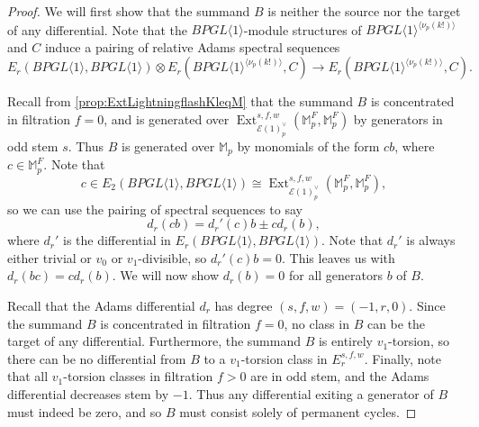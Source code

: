\documentclass{amsart}
\theoremstyle{plain}
\numberwithin{theorem}{section}
\numberwithin{equation}{section}
\numberwithin{figure}{section}
\DeclareMathOperator{\Ext}{Ext}
\newcommand{\mM}{{\mathbb M}}
\newcommand{\cE}{{\mathcal E}}
\newcommand{\0}{\langle 0 \rangle }
\begin{document}
\begin{proof}


We will first show that the summand $B$ is neither the source nor the target of any differential. Note that the $BPGL\langle 1 \rangle$-module structures of $BPGL\langle 1 \rangle^{\langle \nu_p(k!) \rangle}$ and $C$ induce a pairing of relative Adams spectral sequences
\[ E_r\left(BPGL\langle 1 \rangle, BPGL\langle 1 \rangle \right) \otimes E_r\left(BPGL\langle 1 \rangle^{\langle \nu_p(k!) \rangle}, C\right) \to E_r\left(BPGL\langle 1 \rangle^{\langle \nu_p(k!) \rangle}, C\right) .\]

Recall from \cref{prop:ExtLightningflashKleqM} that the summand $B$ is concentrated in filtration $f=0$, and is generated over $\Ext^{s,f,w}_{\cE(1)^\vee_p}(\mM_p^F, \mM_p^F)$ by generators in odd stem $s$. Thus $B$ is generated over $\mathbb{M}_p$ by monomials of the form $cb$, where $c \in \mathbb{M}_p^F$. Note that 
\[
c \in E_2(BPGL\langle 1 \rangle, BPGL\langle 1 \rangle)\cong \Ext^{s,f,w}_{\cE(1)^\vee_p}(\mM_p^F, \mM_p^F),
\]
so we can use the pairing of spectral sequences to say \[d_r\left(cb\right) = d_r'\left(c\right)b \pm cd_r\left(b\right) ,\] 
where $d_r'$ is the differential in $E_r(BPGL\langle 1 \rangle, BPGL \langle 1 \rangle)$. Note that $d_r'$ is always either trivial or $v_0$ or $v_1$-divisible, so $d_r'(c)b = 0$. This leaves us with $d_r(bc) = cd_r(b)$. We will now show $d_r(b) = 0$ for all generators $b$ of $B$. 

Recall that the Adams differential $d_{r}$ has degree $(s,f,w) = (-1,r,0)$. Since the summand $B$ is concentrated in filtration $f=0$, no class in $B$ can be the target of any differential. Furthermore, the summand $B$ is entirely $v_1$-torsion, so there can be no differential from $B$ to a $v_1$-torsion class in $E_r^{s,f,w}$. Finally, note that all $v_1$-torsion classes in filtration $f>0$ are in odd stem, and the Adams differential decreases stem by $-1$. Thus any differential exiting a generator of $B$ must indeed be zero, and so $B$ must consist solely of permanent cycles.


\end{proof}
\end{document}
